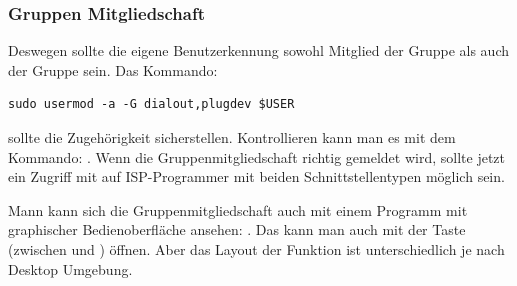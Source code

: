 \subsubsection{Gruppen Mitgliedschaft}

Deswegen sollte die eigene Benutzerkennung sowohl Mitglied der Gruppe  als auch
der Gruppe  sein. Das Kommando:
\begin{large} \vspace{-0.4em} \begin{verbatim}
sudo usermod -a -G dialout,plugdev $USER
\end{verbatim} \end{large}
sollte die Zugehörigkeit sicherstellen. 
Kontrollieren kann man es mit dem Kommando: . 
Wenn die Gruppenmitgliedschaft richtig gemeldet wird,
sollte jetzt ein Zugriff mit  auf ISP-Programmer mit beiden Schnittstellentypen möglich sein.

Mann kann sich die Gruppenmitgliedschaft auch mit einem Programm mit graphischer Bedienoberfläche ansehen:
.
Das  kann man auch mit der \keys{\winmenu} Taste (zwischen  und
\keys{\Alt}) öffnen.
Aber das Layout der Funktion ist unterschiedlich je nach Desktop Umgebung.

